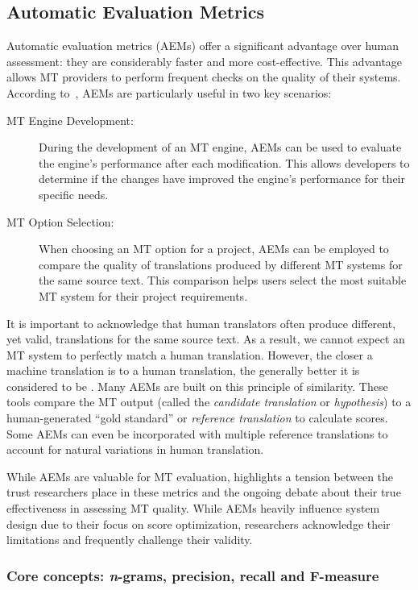 {{\subsection{Automatic Evaluation Metrics}

Automatic evaluation metrics (AEMs) offer a significant advantage over human assessment: they are considerably faster and more cost-effective. This advantage allows MT providers to perform frequent checks on the quality of their systems. According to~\textcite{Rossi2022}, AEMs are particularly useful in two key scenarios:

\begin{description}
    \item[MT Engine Development:] During the development of an MT engine, AEMs can be used to evaluate the engine's performance after each modification. This allows developers to determine if the changes have improved the engine's performance for their specific needs.
    \item[MT Option Selection:] When choosing an MT option for a project, AEMs can be employed to compare the quality of translations produced by different MT systems for the same source text. This comparison helps users select the most suitable MT system for their project requirements.
\end{description}

It is important to acknowledge that human translators often produce different, yet valid, translations for the same source text. As a result, we cannot expect an MT system to perfectly match a human translation. However, the closer a machine translation is to a human translation, the generally better it is considered to be \parencite{Rossi2022}. Many AEMs are built on this principle of similarity. These tools compare the MT output (called the \emph{candidate translation} or \emph{hypothesis}) to a human-generated ``gold standard'' or \emph{reference translation} to calculate scores. Some AEMs can even be incorporated with multiple reference translations to account for natural variations in human translation.

While AEMs are valuable for MT evaluation, \textcite{koehn2020neural} highlights a tension between the trust researchers place in these metrics and the ongoing debate about their true effectiveness in assessing MT quality. While AEMs heavily influence system design due to their focus on score optimization, researchers acknowledge their limitations and frequently challenge their validity. 


\subsubsection{Core concepts: \emph{n}-grams, precision, recall and F-measure}

}}
